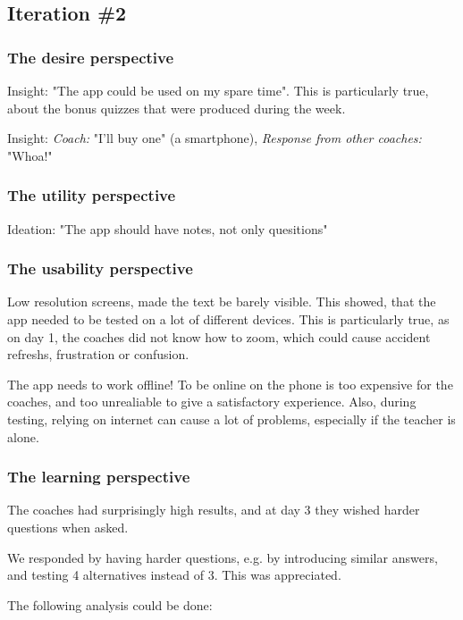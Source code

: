 \subsection{Iteration \#2}

\subsubsection{The desire perspective}

Insight: "The app could be used on my spare time". This is particularly true, about the bonus quizzes that were produced during the week.

Insight: \textit{Coach:} "I'll buy one" (a smartphone), \textit{Response from other coaches: } "Whoa!"

\subsubsection{The utility perspective}

Ideation: "The app should have notes, not only quesitions"

\subsubsection{The usability perspective}

Low resolution screens, made the text be barely visible. This showed, that the app needed to be tested on a lot of different devices. This is particularly true, as on day 1, the coaches did not know how to zoom, which could cause accident refreshs, frustration or confusion.

The app needs to work offline! To be online on the phone is too expensive for the coaches, and too unrealiable to give a satisfactory experience. Also, during testing, relying on internet can cause a lot of problems, especially if the teacher is alone.

\subsubsection{The learning perspective}

    The coaches had surprisingly high results, and at day 3 they wished harder questions when asked.

    We responded by having harder questions, e.g. by introducing similar answers, and testing 4 alternatives instead of 3. This was appreciated.

    The following analysis could be done:

